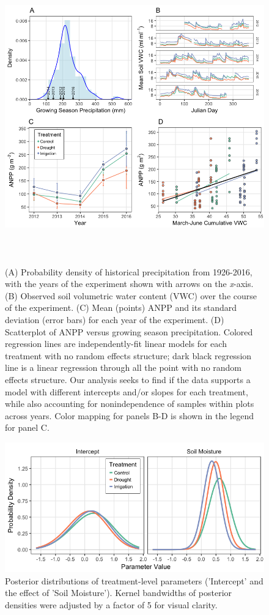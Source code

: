 \documentclass[fleqn,10pt,lineno]{wlpeerj} %
\begin{document}
\begin{figure}[!ht]
  \centering
      \includegraphics[height=5in]{../figures/Figure1.png}
  \caption{(A) Probability density of historical precipitation from 1926-2016, with the years of the experiment shown with arrows on the \emph{x}-axis. (B) Observed soil volumetric water content (VWC) over the course of the experiment. (C) Mean (points) ANPP and its standard deviation (error bars) for each year of the experiment. (D) Scatterplot of ANPP versus growing season precipitation. Colored regression lines are independently-fit linear models for each treatment with no random effects structure; dark black regression line is a linear regression through all the point with no random effects structure. Our analysis seeks to find if the data supports a model with different intercepts and/or slopes for each treatment, while also accounting for nonindependence of samples within plots across years. Color mapping for panels B-D is shown in the legend for panel C.}
\end{figure}

\newpage{}

\begin{figure}[!ht]
  \centering
      \includegraphics[width=5in]{../figures/glmm_treatment_posteriors.png}
  \caption{Posterior distributions of treatment-level parameters ('Intercept' and the effect of 'Soil Moisture'). Kernel bandwidths of posterior densities were adjusted by a factor of 5 for visual clarity.}
\end{figure}
\end{document}
